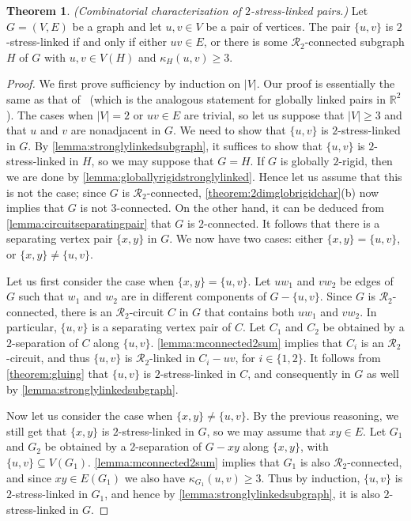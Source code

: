 \documentclass[11pt,a4paper,dvipsnames]{scrartcl}
\theoremstyle{definition}
\newtheorem{theorem}{Theorem}[section]
\newcommand{\RR}{\mathbb{R}}
\newcommand{\globrig}[1]{globally $#1$-rigid}
\newcommand{\strongly}[1]{${#1}$-stress-linked}
\begin{document}
\begin{theorem}\label{theorem:2dimchar} \emph{(Combinatorial characterization of \strongly{2} pairs.)}\newline
    Let $G = (V,E)$ be a graph and let $u,v \in V$ be a pair of vertices. The pair $\{u,v\}$ is \strongly{2} if and only if either $uv \in E$, or there is some $\mathcal{R}_2$-connected subgraph $H$ of $G$ with $u,v \in V(H)$ and $\kappa_H(u,v) \geq 3$. 
\end{theorem}
\begin{proof}
    We first prove sufficiency by induction on $|V|$. Our proof is essentially the same as that of~\cite[Theorem 5.7]{jackson.etal_2006} (which is the analogous statement for globally linked pairs in $\RR^2$). The cases when $|V| = 2$ or $uv \in E$ are trivial, so let us suppose that $|V| \geq 3$ and that $u$ and $v$ are nonadjacent in $G$. We need to show that $\{u,v\}$ is \strongly{2} in $G$. By \cref{lemma:stronglylinkedsubgraph}, it suffices to show that $\{u,v\}$ is \strongly{2} in $H$, so we may suppose that $G = H$. If $G$ is \globrig{2}, then we are done by \cref{lemma:globallyrigidstronglylinked}. Hence let us assume that this is not the case; since $G$ is $\mathcal{R}_2$-connected, \cref{theorem:2dimglobrigidchar}(b) now implies that $G$ is not $3$-connected. On the other hand, it can be deduced from \cref{lemma:circuitseparatingpair} that $G$ is $2$-connected. It follows that there is a separating vertex pair $\{x,y\}$ in $G$. We now have two cases: either $\{x,y\} = \{u,v\}$, or $\{x,y\} \neq \{u,v\}$.
    
    Let us first consider the case when $\{x,y\} = \{u,v\}$. Let $uw_1$ and $vw_2$ be edges of $G$ such that $w_1$ and $w_2$ are in different components of $G-\{u,v\}$. Since $G$ is $\mathcal{R}_2$-connected, there is an $\mathcal{R}_2$-circuit $C$ in $G$ that contains both $uw_1$ and $vw_2$. In particular, $\{u,v\}$ is a separating vertex pair of $C$. Let $C_1$ and $C_2$ be obtained by a $2$-separation of $C$ along $\{u,v\}$.  \cref{lemma:mconnected2sum} implies that $C_i$ is an $\mathcal{R}_2$-circuit, and thus $\{u,v\}$ is $\mathcal{R}_2$-linked in $C_i-uv$, for $i \in \{1,2\}$. It follows from \cref{theorem:gluing} that $\{u,v\}$ is \strongly{2} in $C$, and consequently in $G$ as well by \cref{lemma:stronglylinkedsubgraph}.
    
    Now let us consider the case when $\{x,y\} \neq \{u,v\}$. By the previous reasoning, we still get that $\{x,y\}$ is \strongly{2} in $G$, so we may assume that $xy \in E$. Let $G_1$ and $G_2$ be obtained by a $2$-separation of $G-xy$ along $\{x,y\}$, with $\{u,v\} \subseteq V(G_1)$. \cref{lemma:mconnected2sum} implies that $G_1$ is also $\mathcal{R}_2$-connected, and since $xy \in E(G_1)$ we also have $\kappa_{G_1}(u,v) \geq 3$. Thus by induction, $\{u,v\}$ is \strongly{2} in $G_1$, and hence by \cref{lemma:stronglylinkedsubgraph}, it is also \strongly{2} in $G$.
    

\end{proof}
\end{document}
